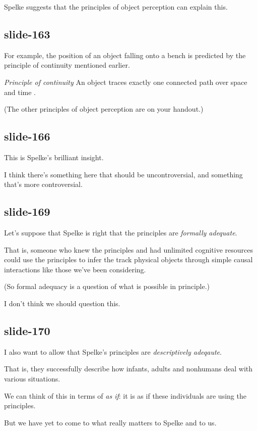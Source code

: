\documentclass[12pt,\papersize]{extarticle}
\begin{document}
Spelke suggests that the principles of object perception can explain this.
 
\subsection{slide-163}
For example, the position of an object falling onto a bench is predicted by the principle of continuity mentioned earlier.
 
\emph{Principle of continuity} An object traces exactly one connected path over space and time \citep[p.\ 113]{spelke:1995_spatiotemporal}.
 
(The other principles of object perception are on your handout.)
 
\subsection{slide-166}
This is Spelke's brilliant insight.
 
I think there's something here that should be uncontroversial, and something that's more controversial.
 
\subsection{slide-169}
Let's suppose that Spelke is right that the principles are \emph{formally adequate}.
 
That is, someone who knew the principles and had unlimited cognitive resources could use the principles to infer the track physical objects through simple causal interactions like those we've been considering.
 
(So formal adequacy is a question of what is possible in principle.)
 
I don't think we should question this.
 
\subsection{slide-170}
I also want to allow that Spelke's principles are \emph{descriptively adeqaute}.
 
That is, they successfully describe how infants, adults and nonhumans deal with various situations.
 
We can think of this in terms of \emph{as if}: it is as if these individuals are using the principles.
 
But we have yet to come to what really matters to Spelke and to us.
 
\end{document}
